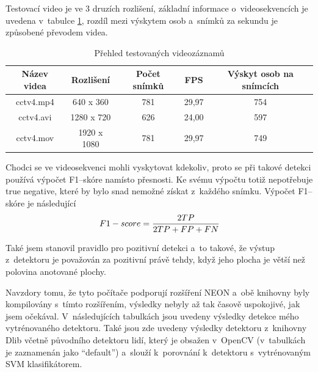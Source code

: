 Testovací video je ve 3 druzích rozlišení, základní informace o~videosekvencích je uvedena v~tabulce \ref{videosTab}, rozdíl mezi výskytem osob a~snímků za sekundu je způsobené převodem videa.

\begin{table}[H]
\centering
\caption{Přehled testovaných videozáznamů}
\begin{tabular} { |c|c|c|c|c| }
\hline
{Název videa}   & {Rozlišení} 	&   {Počet snímků}  & {FPS} & {Výskyt osob na snímcích} \\ \hline
cctv4.mp4 	 &  640 x  360	     &      781		& 29,97 & 	      754			 \\ \hline
cctv4.avi		 & 1280 x  720	     &      626		& 24,00 & 	      597			 \\ \hline
cctv4.mov 	 & 1920 x 1080	     &      781		& 29,97 & 	      749			 \\ \hline
\end{tabular}
\label{videosTab}
\end{table}

Chodci se ve videosekvenci mohli vyskytovat kdekoliv, proto se při takové detekci používá výpočet F1--skóre namísto přesnosti. Ke svému výpočtu totiž nepotřebuje true negative, které by bylo snad nemožné získat z~každého snímku. Výpočet F1--skóre je následující
\begin{equation*}
\centering
 \label{eq:f1score}
 \begin{aligned}
F1-score = \frac{ 2TP}{2TP + FP + FN}
 \end{aligned}
\end{equation*}

Také jsem stanovil pravidlo pro pozitivní detekci a~to takové, že výstup z~detektoru je považován za pozitivní právě tehdy, když jeho plocha je větší než polovina anotované plochy. 

Navzdory tomu, že tyto počítače podporují rozšíření NEON a~obě knihovny byly kompilovány s~tímto rozšířením, výsledky nebyly až tak časově uspokojivé, jak jsem očekával. V~následujících tabulkách jsou uvedeny výsledky detekce mého vytrénovaného detektoru. Také jsou zde uvedeny výsledky detektoru z~knihovny Dlib včetně původního detektoru lidí, který je obsažen v~OpenCV (v~tabulkách je zaznamenán jako ``default'') a~slouží k~porovnání k~detektoru s~vytrénovaným SVM klasifikátorem. 

